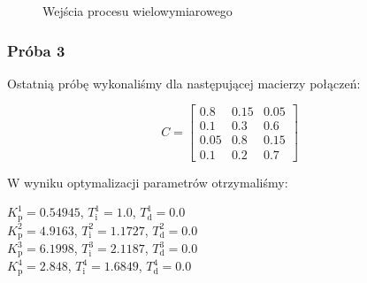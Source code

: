 \begin{figure}
    \begin{subfigure}[b]{\textwidth}
        \centering
    \end{subfigure}

    \caption{Wejścia procesu wielowymiarowego}
    \label{pro_pid_konf3_in2}
\end{figure}
\FloatBarrier

\subsubsection{Próba 3}

Ostatnią próbę wykonaliśmy dla następującej macierzy połączeń:

\[
C =
\begin{bmatrix}
    0.8 & 0.15 & 0.05 \\
    0.1 & 0.3 & 0.6 \\
    0.05 & 0.8 & 0.15 \\
    0.1 & 0.2 & 0.7 
\end{bmatrix}
\]

W wyniku optymalizacji parametrów otrzymaliśmy:

\begin{center}
    $K^{\num{1}}_{\mathrm{p}} = \num{0.54945}$, $T^{\num{1}}_{\mathrm{i}} = \num{1.0}$, $T^{\num{1}}_{\mathrm{d}} = \num{0.0}$ \\
    $K^{\num{2}}_{\mathrm{p}} = \num{4.9163}$, $T^{\num{2}}_{\mathrm{i}} = \num{1.1727}$, $T^{\num{2}}_{\mathrm{d}} = \num{0.0}$ \\
    $K^{\num{3}}_{\mathrm{p}} = \num{6.1998}$, $T^{\num{3}}_{\mathrm{i}} = \num{2.1187}$, $T^{\num{3}}_{\mathrm{d}} = \num{0.0}$ \\
    $K^{\num{4}}_{\mathrm{p}} = \num{2.848}$, $T^{\num{4}}_{\mathrm{i}} = \num{1.6849}$, $T^{\num{4}}_{\mathrm{d}} = \num{0.0}$ \\
\end{center}

